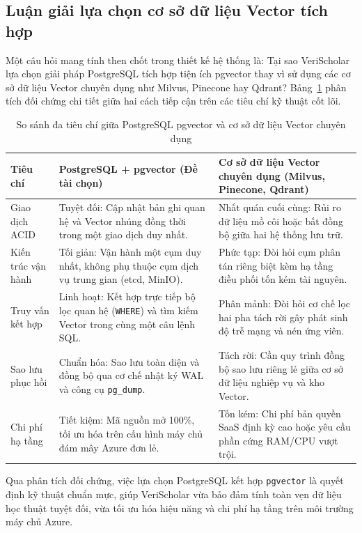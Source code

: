 \subsection{Luận giải lựa chọn cơ sở dữ liệu Vector tích hợp}
\label{subsec:vector_db_justification}
Một câu hỏi mang tính then chốt trong thiết kế hệ thống là: Tại sao VeriScholar lựa chọn giải pháp PostgreSQL tích hợp tiện ích pgvector thay vì sử dụng các cơ sở dữ liệu Vector chuyên dụng như Milvus, Pinecone hay Qdrant? Bảng~\ref{tab:vector_db_comparison} phân tích đối chứng chi tiết giữa hai cách tiếp cận trên các tiêu chí kỹ thuật cốt lõi.

\begin{table}[!htbp]
\centering
\caption{So sánh đa tiêu chí giữa PostgreSQL pgvector và cơ sở dữ liệu Vector chuyên dụng}
\label{tab:vector_db_comparison}
\setlength{\tabcolsep}{5pt}
\renewcommand{\arraystretch}{1.20}
\begin{tabularx}{\textwidth}{|>{\centering\arraybackslash}m{3.0cm}|>{\raggedright\arraybackslash}X|>{\raggedright\arraybackslash}X|}
\hline
\textbf{Tiêu chí} & \centering\textbf{PostgreSQL + pgvector (Đề tài chọn)} & \centering\textbf{Cơ sở dữ liệu Vector chuyên dụng (Milvus, Pinecone, Qdrant)} \tabularnewline
\hline
Giao dịch ACID & Tuyệt đối: Cập nhật bản ghi quan hệ và Vector nhúng đồng thời trong một giao dịch duy nhất. & Nhất quán cuối cùng: Rủi ro dữ liệu mồ côi hoặc bất đồng bộ giữa hai hệ thống lưu trữ. \\
\hline
Kiến trúc vận hành & Tối giản: Vận hành một cụm duy nhất, không phụ thuộc cụm dịch vụ trung gian (etcd, MinIO). & Phức tạp: Đòi hỏi cụm phân tán riêng biệt kèm hạ tầng điều phối tốn kém tài nguyên. \\
\hline
Truy vấn kết hợp & Linh hoạt: Kết hợp trực tiếp bộ lọc quan hệ (\texttt{WHERE}) và tìm kiếm Vector trong cùng một câu lệnh SQL. & Phân mảnh: Đòi hỏi cơ chế lọc hai pha tách rời gây phát sinh độ trễ mạng và nén ứng viên. \\
\hline
Sao lưu phục hồi & Chuẩn hóa: Sao lưu toàn diện và đồng bộ qua cơ chế nhật ký WAL và công cụ \texttt{pg\_dump}. & Tách rời: Cần quy trình đồng bộ sao lưu riêng lẻ giữa cơ sở dữ liệu nghiệp vụ và kho Vector. \\
\hline
Chi phí hạ tầng & Tiết kiệm: Mã nguồn mở 100\%, tối ưu hóa trên cấu hình máy chủ đám mây Azure đơn lẻ. & Tốn kém: Chi phí bản quyền SaaS định kỳ cao hoặc yêu cầu phần cứng RAM/CPU vượt trội. \\
\hline
\end{tabularx}
\end{table}

Qua phân tích đối chứng, việc lựa chọn PostgreSQL kết hợp \texttt{pgvector} là quyết định kỹ thuật chuẩn mực, giúp VeriScholar vừa bảo đảm tính toàn vẹn dữ liệu học thuật tuyệt đối, vừa tối ưu hóa hiệu năng và chi phí hạ tầng trên môi trường máy chủ Azure.
